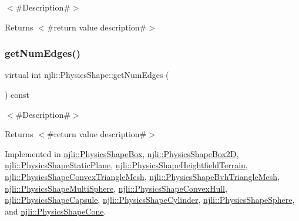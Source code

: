 $<$\#\+Description\#$>$

\begin{DoxyReturn}{Returns}
$<$\#return value description\#$>$ 
\end{DoxyReturn}
\mbox{\label{classnjli_1_1_physics_shape_a24df999ba2b7ac0d9abda09c4f17c2fe}} 
\subsubsection{\texorpdfstring{get\+Num\+Edges()}{getNumEdges()}}
{\footnotesize\ttfamily virtual int njli\+::\+Physics\+Shape\+::get\+Num\+Edges (\begin{DoxyParamCaption}{ }\end{DoxyParamCaption}) const\hspace{0.3cm}{\ttfamily [pure virtual]}}

$<$\#\+Description\#$>$

\begin{DoxyReturn}{Returns}
$<$\#return value description\#$>$ 
\end{DoxyReturn}


Implemented in \mbox{\hyperlink{classnjli_1_1_physics_shape_box_afaa84e3e0b58aa2fd2a1bdd269c39c21}{njli\+::\+Physics\+Shape\+Box}}, \mbox{\hyperlink{classnjli_1_1_physics_shape_box2_d_ab116e4bce67ace59c1d7b6f687a66d75}{njli\+::\+Physics\+Shape\+Box2D}}, \mbox{\hyperlink{classnjli_1_1_physics_shape_static_plane_ab6a794d539b83627a5ccd4f7b85a531d}{njli\+::\+Physics\+Shape\+Static\+Plane}}, \mbox{\hyperlink{classnjli_1_1_physics_shape_heightfield_terrain_abb31574ee5a71532d25cb045a840aedf}{njli\+::\+Physics\+Shape\+Heightfield\+Terrain}}, \mbox{\hyperlink{classnjli_1_1_physics_shape_convex_triangle_mesh_a71cabda2ee30273b0a6ae2f5b390102f}{njli\+::\+Physics\+Shape\+Convex\+Triangle\+Mesh}}, \mbox{\hyperlink{classnjli_1_1_physics_shape_bvh_triangle_mesh_ace1bebc13dc826cfc9475b55ba58c5d4}{njli\+::\+Physics\+Shape\+Bvh\+Triangle\+Mesh}}, \mbox{\hyperlink{classnjli_1_1_physics_shape_multi_sphere_a24afd8e689b4111391f8079376edfbc6}{njli\+::\+Physics\+Shape\+Multi\+Sphere}}, \mbox{\hyperlink{classnjli_1_1_physics_shape_convex_hull_ae60a0cdaceb0fe22f53425b38d4b039d}{njli\+::\+Physics\+Shape\+Convex\+Hull}}, \mbox{\hyperlink{classnjli_1_1_physics_shape_capsule_a0e06d7b68da66e3af079f5e700d384c6}{njli\+::\+Physics\+Shape\+Capsule}}, \mbox{\hyperlink{classnjli_1_1_physics_shape_cylinder_a05334d41b8bad6261922842a5c204015}{njli\+::\+Physics\+Shape\+Cylinder}}, \mbox{\hyperlink{classnjli_1_1_physics_shape_sphere_a1031a181ab93d60ae32e97332618287c}{njli\+::\+Physics\+Shape\+Sphere}}, and \mbox{\hyperlink{classnjli_1_1_physics_shape_cone_a238d949b674d432f4f7f4accbcae1d8d}{njli\+::\+Physics\+Shape\+Cone}}.

